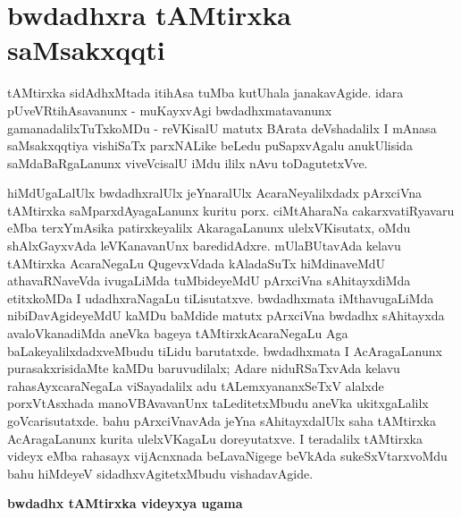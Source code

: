 \makeatletter
\def\@makechapterhead#1{%
  \vspace*{10\p@}%
{\fontsize{13pt}{13pt}\selectfont\raggedright{\bf  benAyf toVSf BaTATxcAyaR}\par}
\vspace*{25\p@}%
  {\parindent \z@ \centering \normalfont
    \ifnum \c@secnumdepth >\m@ne
      \if@mainmatter
        {\huge\bfseries  #1}\par\nobreak
	\vskip 4pt
      \fi
    \fi
\smallskip 

 \vskip 10\p@  
{\fontsize{12pt}{12pt}\selectfont\raggedleft{anu: \bf pu.ti.na.}\par}
  }
\vskip 30\p@}
\makeatother

\chapter{bwdadhxra tAMtirxka saMsakxqqti}\label{chap003}

tAMtirxka sidAdhxMtada itihAsa tuMba kutUhala janakavAgide. idara pUveVRtihAsa\-vanunx - muKayxvAgi bwdadhxmatavanunx gamanadalilxTuTxkoMDu - reVKisalU matutx BArata deVshadalilx I mAnasa saMsakxqqtiya vishiSaTx parxNALike beLedu puSapxvAgalu anukUlisida saMdaBaRgaLanunx viveVcisalU iMdu ililx nAvu toDagutetxVve.

hiMdUgaLalUlx bwdadhxralUlx jeYnaralUlx AcaraNeyalilxdadx pArxciVna tAMtirxka saMparxdAyagaLanunx kuritu porx. ciMtAharaNa cakarxvatiRyavaru  eMba terxYmAsika patirxkeyalilx AkaragaLanunx ulelxVKisutatx, oMdu shAlxGayxvAda leVKanavanUnx baredidAdxre. mUlaBUtavAda kelavu tAMtirxka AcaraNegaLu QugevxVdada kAladaSuTx hiMdinaveMdU athavaRNaveVda ivugaLiMda tuMbideyeMdU pArxciVna sAhitayxdiMda etitxkoMDa I udadhxraNagaLu tiLisutatxve. bwdadhxmata iMthavugaLiMda nibiDavAgideyeMdU kaMDu baMdide matutx pArxciVna bwdadhx sAhitayxda avaloVkanadiMda aneVka bageya tAMtirxkAcaraNegaLu Aga baLakeyalilxdadxveMbudu tiLidu barutatxde. bwdadhxmata I AcAragaLanunx purasakxrisidaMte kaMDu baruvudilalx; Adare niduRSaTxvAda kelavu rahasAyxcaraNegaLa viSayadalilx adu tALemxyananxSeTxV alalxde porxVtAsxhada manoVBAvavanUnx taLeditetxMbudu aneVka ukitxgaLalilx goVcarisutatxde. bahu pArxciVnavAda jeYna sAhitayxdalUlx saha tAMtirxka AcAragaLanunx kurita ulelxVKagaLu doreyutatxve. I teradalilx tAMtirxka videyx eMba rahasayx vijAcnxnada beLavaNigege beVkAda sukeSxVtarxvoMdu bahu hiMdeyeV sidadhxvAgitetxMbudu vishadavAgide.

\smallskip
\begin{center}
{\Large\bf bwdadhx tAMtirxka videyxya ugama}
\end{center}


